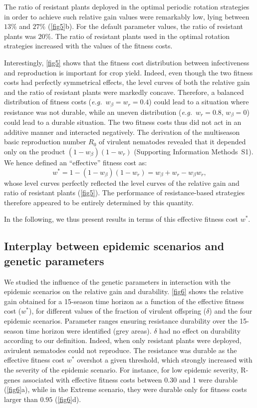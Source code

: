 {{{{The ratio of resistant plants deployed in the optimal periodic
rotation strategies in order to achieve such relative gain values were
remarkably low, lying between $13\%$ and $27\%$
(\autoref{fig5}b). For the default parameter values, the
ratio of resistant plants was $20\%$. The ratio of
resistant plants used in the optimal rotation strategies increased
with the values of the fitness costs.

Interestingly, \autoref{fig5} shows that the fitness cost
distribution between infectiveness and reproduction is important for
crop yield. Indeed, even though the two fitness costs had perfectly
symmetrical effects, the level curves of both the relative gain and
the ratio of resistant plants were markedly concave. Therefore, a
balanced distribution of fitness costs (\textit{e.g.}\
$w_{\beta}=w_{r}=0.4$) could lead to a situation where resistance was
not durable, while an uneven distribution (\textit{e.g.}\ $w_{r}=0.8$,
$w_{\beta}=0$) could lead to a durable situation. The two fitness
costs thus did not act in an additive manner and interacted
negatively.  The derivation of the multiseason basic reproduction
number $R_{0}$ of virulent nematodes revealed that it depended only on
the product $(1-w_{\beta})(1-w_{r})$ (Supporting Information Methods~S1).  We hence defined an ``effective'' fitness cost as:
\begin{equation}
  w^{*}=1-(1-w_{\beta})(1-w_{r})=w_{\beta}+w_{r}-w_{\beta}w_{r},
  \label{eff_w}
\end{equation}
whose level curves perfectly reflected the level curves of the
relative gain and ratio of resistant plants
(\autoref{fig5}). The performance of resistance-based
strategies therefore appeared to be entirely determined by this
quantity.

In the following, we thus present results in terms of this effective
fitness cost $w^{*}$.

\subsection{Interplay between epidemic scenarios and  genetic parameters}

We studied the influence of the genetic parameters in interaction with
the epidemic scenarios on the relative gain and
durability. \autoref{fig6} shows the relative gain obtained for a
15-season time horizon as a function of the effective fitness cost
($w^*$), for different values of the fraction of virulent offspring
($\delta$) and the four epidemic scenarios. Parameter ranges ensuring resistance durability
over the 15-season time horizon were identified (grey areas).
$\delta$ had no effect on durability according to our
definition. Indeed, when only resistant plants were deployed,
avirulent nematodes could not reproduce. The resistance was durable as
the effective fitness cost $w^*$ {overshot} a given threshold, which
strongly increased with the severity of the epidemic scenario.  For
instance, for {low epidemic severity}, R-genes
associated with effective fitness costs between $0.30$ and $1$ were
durable (\autoref{fig6}a), while in the Extreme scenario, they
were durable only for fitness costs larger than $0.95$
(\autoref{fig6}d).

}}}}
